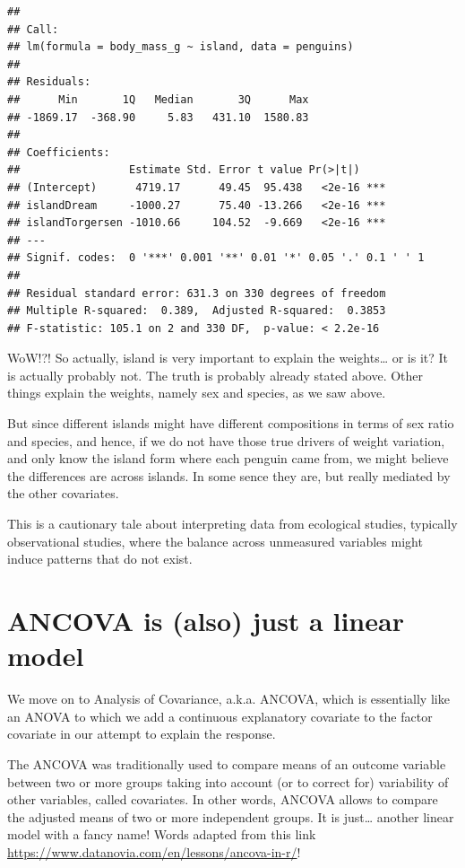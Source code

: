 \documentclass[
]{book}
\begin{document}
\begin{verbatim}
## 
## Call:
## lm(formula = body_mass_g ~ island, data = penguins)
## 
## Residuals:
##      Min       1Q   Median       3Q      Max 
## -1869.17  -368.90     5.83   431.10  1580.83 
## 
## Coefficients:
##                 Estimate Std. Error t value Pr(>|t|)    
## (Intercept)      4719.17      49.45  95.438   <2e-16 ***
## islandDream     -1000.27      75.40 -13.266   <2e-16 ***
## islandTorgersen -1010.66     104.52  -9.669   <2e-16 ***
## ---
## Signif. codes:  0 '***' 0.001 '**' 0.01 '*' 0.05 '.' 0.1 ' ' 1
## 
## Residual standard error: 631.3 on 330 degrees of freedom
## Multiple R-squared:  0.389,  Adjusted R-squared:  0.3853 
## F-statistic: 105.1 on 2 and 330 DF,  p-value: < 2.2e-16
\end{verbatim}

WoW!?! So actually, island is very important to explain the weights\ldots{} or is it? It is actually probably not. The truth is probably already stated above. Other things explain the weights, namely sex and species, as we saw above.

But since different islands might have different compositions in terms of sex ratio and species, and hence, if we do not have those true drivers of weight variation, and only know the island form where each penguin came from, we might believe the differences are across islands. In some sence they are, but really mediated by the other covariates.

This is a cautionary tale about interpreting data from ecological studies, typically observational studies, where the balance across unmeasured variables might induce patterns that do not exist.

\hypertarget{ANCOVAasLM}{%
\chapter{ANCOVA is (also) just a linear model}\label{ANCOVAasLM}}

We move on to Analysis of Covariance, a.k.a. ANCOVA, which is essentially like an ANOVA to which we add a continuous explanatory covariate to the factor covariate in our attempt to explain the response.

The ANCOVA was traditionally used to compare means of an outcome variable between two or more groups taking into account (or to correct for) variability of other variables, called covariates. In other words, ANCOVA allows to compare the adjusted means of two or more independent groups. It is just\ldots{} another linear model with a fancy name! Words adapted from this link \url{https://www.datanovia.com/en/lessons/ancova-in-r/}!
\end{document}
